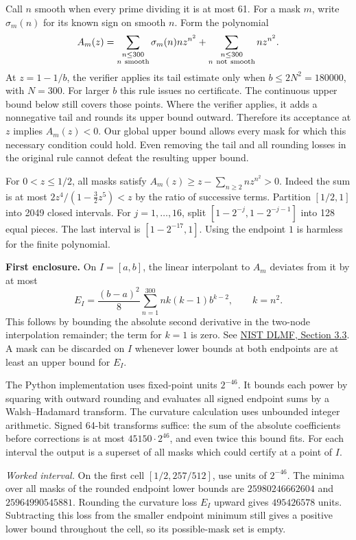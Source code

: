 \documentclass[11pt]{article}
\newcommand{\sechead}[1]{\medskip{\large\bfseries #1}\par}
\begin{document}
\newpage
\sechead{5. A necessary condition over a continuous interval}
Call $n$ smooth when every prime dividing it is at most 61. For a mask $m$, write $\sigma_m(n)$ for its known sign on smooth $n$. Form the polynomial
\[
 A_m(z)=\sum_{\substack{n\le300\\ n\ {\rm smooth}}}\sigma_m(n)n z^{n^2}
       +\sum_{\substack{n\le300\\ n\ {\rm not\ smooth}}}n z^{n^2}.
\]
At $z=1-1/b$, the verifier applies its tail estimate only when $b\le 2N^2=180000$, with $N=300$. For larger $b$ this rule issues no certificate. The continuous upper bound below still covers those points. Where the verifier applies, it adds a nonnegative tail and rounds its upper bound outward. Therefore its acceptance at $z$ implies $A_m(z)<0$. Our global upper bound allows every mask for which this necessary condition could hold. Even removing the tail and all rounding losses in the original rule cannot defeat the resulting upper bound.

For $0<z\le1/2$, all masks satisfy $A_m(z)\ge z-\sum_{n\ge2}nz^{n^2}>0$. Indeed the sum is at most $2z^4/(1-\tfrac32 z^5)<z$ by the ratio of successive terms. Partition $[1/2,1]$ into 2049 closed intervals. For $j=1,\ldots,16$, split $[1-2^{-j},1-2^{-j-1}]$ into 128 equal pieces. The last interval is $[1-2^{-17},1]$. Using the endpoint $1$ is harmless for the finite polynomial.

\textbf{First enclosure.} On $I=[a,b]$, the linear interpolant to $A_m$ deviates from it by at most
\[
 E_I=\frac{(b-a)^2}{8}\sum_{n=1}^{300}n k(k-1)b^{k-2},\qquad k=n^2 .
\]
This follows by bounding the absolute second derivative in the two-node interpolation remainder; the term for $k=1$ is zero. See \href{https://dlmf.nist.gov/3.3}{NIST DLMF, Section 3.3}. A mask can be discarded on $I$ whenever lower bounds at both endpoints are at least an upper bound for $E_I$.

The Python implementation uses fixed-point units $2^{-46}$. It bounds each power by squaring with outward rounding and evaluates all signed endpoint sums by a Walsh--Hadamard transform. The curvature calculation uses unbounded integer arithmetic. Signed 64-bit transforms suffice: the sum of the absolute coefficients before corrections is at most $45150\cdot2^{46}$, and even twice this bound fits. For each interval the output is a superset of all masks which could certify at a point of $I$.

\textit{Worked interval.} On the first cell $[1/2,257/512]$, use units of $2^{-46}$. The minima over all masks of the rounded endpoint lower bounds are $25980246662604$ and $25964990545881$. Rounding the curvature loss $E_I$ upward gives $495426578$ units. Subtracting this loss from the smaller endpoint minimum still gives a positive lower bound throughout the cell, so its possible-mask set is empty.
\end{document}
